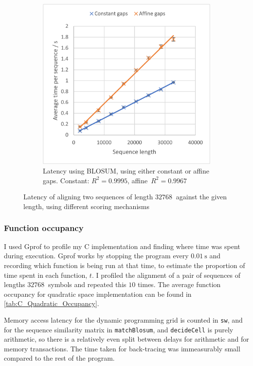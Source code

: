 \begin{figure}
\begin{subfigure}{.49\textwidth}
      \includegraphics[width=\linewidth]{figs/eval/cu_gotoh.pdf}
      \caption{Latency using BLOSUM, using either constant or affine gaps. Constant: $R^2=0.9995$, \mbox{affine}~${R^2=0.9967}$}
      \label{fig:C_Gotoh}
    \end{subfigure}
    \caption{Latency of aligning two sequences of length $\SI{32768}{}$ against the given length, using different scoring mechanisms}
    \label{fig:C_Scoring}
\end{figure}

\subsubsection{Function occupancy}
\label{sec:C_occupancy}

I used Gprof to profile my C implementation and finding where time was spent during execution.
Gprof works by stopping the program every $\SI{0.01}{\s}$ and recording which function is being run at that time, to estimate the proportion of time spent in each function, $t$.
I profiled the alignment of a pair of sequences of lengths $\SI{32768}{}$ symbols and repeated this $10$ times.
The average function occupancy for quadratic space implementation can be found in \cref{tab:C_Quadratic_Occupancy}.

Memory access latency for the dynamic programming grid is counted in \lstinline{sw}, and for the sequence similarity matrix in \lstinline{matchBlosum}, and \lstinline{decideCell} is purely arithmetic, so there is a relatively even split between delays for arithmetic and for memory transactions.
The time taken for back-tracing was immeasurably small compared to the rest of the program.

